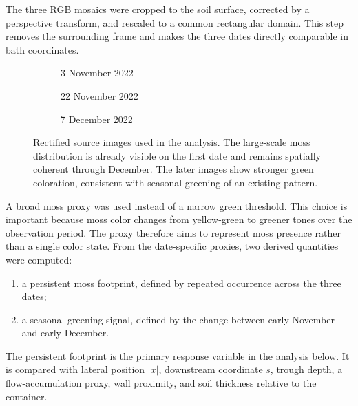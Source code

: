 \documentclass[11pt,a4paper]{article}
\begin{document}
The three RGB mosaics were cropped to the soil surface, corrected by a
perspective transform, and rescaled to a common rectangular domain. This step
removes the surrounding frame and makes the three dates directly comparable in
bath coordinates.

\begin{figure}[H]
  \centering
  \begin{subfigure}[t]{0.31\linewidth}
    \centering
    \caption{3 November 2022}
  \end{subfigure}
  \hfill
  \begin{subfigure}[t]{0.31\linewidth}
    \centering
    \caption{22 November 2022}
  \end{subfigure}
  \hfill
  \begin{subfigure}[t]{0.31\linewidth}
    \centering
    \caption{7 December 2022}
  \end{subfigure}
  \caption{Rectified source images used in the analysis. The large-scale moss
  distribution is already visible on the first date and remains spatially
  coherent through December. The later images show stronger green coloration,
  consistent with seasonal greening of an existing pattern.}
  \label{fig:rectified-images}
\end{figure}

A broad moss proxy was used instead of a narrow green threshold. This choice is
important because moss color changes from yellow-green to greener tones over
the observation period. The proxy therefore aims to represent moss presence
rather than a single color state. From the date-specific proxies, two derived
quantities were computed:
\begin{enumerate}[leftmargin=1.5em]
  \item a persistent moss footprint, defined by repeated occurrence across the
  three dates;
  \item a seasonal greening signal, defined by the change between early November
  and early December.
\end{enumerate}

The persistent footprint is the primary response variable in the analysis below.
It is compared with lateral position \(|x|\), downstream coordinate \(s\), trough
depth, a flow-accumulation proxy, wall proximity, and soil thickness relative to
the container.
\end{document}
